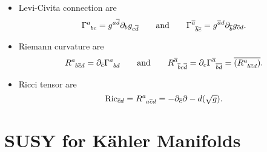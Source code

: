 \begin{itemize}
  \item Levi-Civita connection are
    \begin{equation}
      \Gamma\indices{^{a}_{bc}} = g^{a \overline{d}{}} \partial_b g_{c \overline{d}{}} \qquad \text{and} \qquad \Gamma\indices{^{\overline{a}{}}_{\overline{b}{} \overline{c}{}}} = g^{\overline{a}{} d} \partial_{\overline{b}{}} g_{\overline{c}{} d}.
    \end{equation}
  \item Riemann curvature are
    \begin{equation}
      R\indices{^{a}_{b \overline{ c}{} d}} = \partial_{\overline{c}{}} \Gamma\indices{^{a}_{bd}} \qquad \text{and} \qquad R\indices{^{\overline{a}{}}_{\overline{b}{} c \overline{d}{}}} = \partial_c \Gamma \indices{^{\overline{a}{}}_{\overline{b}{} \overline{d}{}}} = \overline{(R\indices{^{a}_{b \overline{c}{} d}})}{}.
    \end{equation}
  \item Ricci tensor are
    \begin{equation}
      \text{Ric}_{\overline{c}{} d} = R\indices{^{a}_{a \overline{c}{} d}} = - \partial_{\overline{c}{}} \partial-d (\sqrt{g}).
    \end{equation}
\end{itemize}

\section{SUSY for Kähler Manifolds}%
\label{sec:susy_for_kahler_manifolds}

